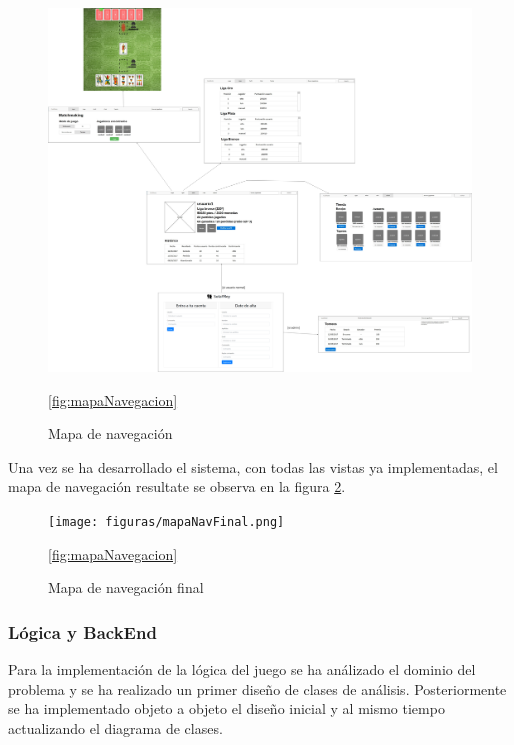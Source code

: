 \begin{figure}
  \includegraphics[width=\linewidth]{figuras/mapaNavegacion.png}
  \caption{Mapa de navegación}
  \label{fig:mapaDeNavegacion}
  \ref{fig:mapaNavegacion}
\end{figure}

Una vez se ha desarrollado el sistema, con todas las vistas ya implementadas, el mapa de navegación resultate se observa en la figura \ref{fig:mapaDeNavegacionFinal}.

\begin{figure}
  \texttt{[image: figuras/mapaNavFinal.png]}
  \caption{Mapa de navegación final}
  \label{fig:mapaDeNavegacionFinal}
  \ref{fig:mapaNavegacion}
\end{figure}

\subsubsection{Lógica y BackEnd}

Para la implementación de la lógica del juego se ha análizado el dominio del problema y se ha realizado un primer diseño de clases de análisis. Posteriormente se ha implementado objeto a objeto el diseño inicial y al mismo tiempo actualizando el diagrama de clases.

